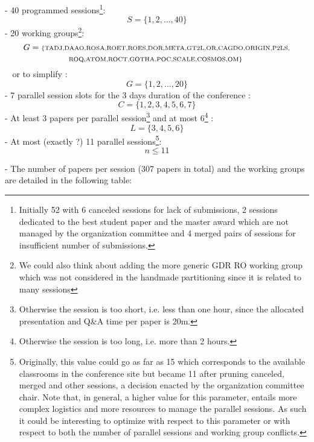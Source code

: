 \documentclass{article}
\begin{document}
- 40 programmed sessions\footnote{Initially 52 with 6 canceled sessions for lack of submissions, 2 sessions dedicated to the best student paper and the master award which are not managed by the organization committee and 4 merged pairs of sessions for insufficient number of submissions.}:
    $$ S=\{1,2,\dots,40\}$$
- 20 working groups\footnote{We could also think about adding the more generic GDR RO working group which was not considered in the handmade partitioning since it is related to many sessions}:
$$ G = \mbox{\scriptsize \{TADJ,DAAO,ROSA,ROET,ROES,DOR,META,GT2L,OR,CAGDO,ORIGIN,P2LS,}$$\vspace*{-0.8cm} $$\mbox{\scriptsize ROQ,ATOM,ROCT,GOTHA,POC,SCALE,COSMOS,OM\} }
$$
$\;\;$ or to simplify :
$$ G = \{1,2,\dots,20\}$$
- 7 parallel session slots for the 3 days duration of  the conference : $$C = \{1,2,3,4,5,6,7\}$$ 
- At least 3 papers per parallel session\footnote{Otherwise the session is too short, i.e. less than one hour, since the allocated presentation and Q\&A time per paper is 20m.}  and at most 6\footnote{Otherwise the session is too long, i.e. more than 2 hours.} :
$$L=\{3,4,5,6\}$$
- At most (exactly ?) 11 parallel sessions\footnote{Originally, this value could go as far as 15 which corresponds to the available classrooms in the conference site but became 11 after pruning canceled, merged and other sessions, a decision enacted by the organization committee chair. Note that, in general, a higher value for this parameter, entails more complex logistics and more resources to manage the parallel sessions. As such it could be interesting to optimize with respect to this parameter or with respect to both the number of parallel sessions and working group conflicts.}:
    $$ n \leq 11$$

- The number of papers per session (307 papers in total) and the working groups are detailed in the following table:
\end{document}
